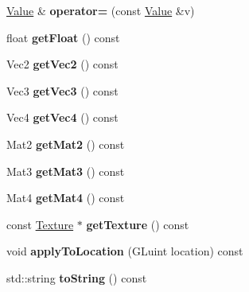 \begin{DoxyCompactItemize}
\item 
\hypertarget{classg2c_1_1_value_affb4cff78b519667994ae075cce2be1e}{
\hyperlink{classg2c_1_1_value}{Value} \& {\bfseries operator=} (const \hyperlink{classg2c_1_1_value}{Value} \&v)}
\label{classg2c_1_1_value_affb4cff78b519667994ae075cce2be1e}

\item 
\hypertarget{classg2c_1_1_value_af8cdb1c197e22bfc84be9525538747e6}{
float {\bfseries getFloat} () const }
\label{classg2c_1_1_value_af8cdb1c197e22bfc84be9525538747e6}

\item 
\hypertarget{classg2c_1_1_value_ac0f42a35725e5831e34440135aa5e806}{
Vec2 {\bfseries getVec2} () const }
\label{classg2c_1_1_value_ac0f42a35725e5831e34440135aa5e806}

\item 
\hypertarget{classg2c_1_1_value_ad184ef70572f68b2594b9925bfbcb56d}{
Vec3 {\bfseries getVec3} () const }
\label{classg2c_1_1_value_ad184ef70572f68b2594b9925bfbcb56d}

\item 
\hypertarget{classg2c_1_1_value_a81fd98e6c48e9c247f694d2549705d14}{
Vec4 {\bfseries getVec4} () const }
\label{classg2c_1_1_value_a81fd98e6c48e9c247f694d2549705d14}

\item 
\hypertarget{classg2c_1_1_value_ad9f2144e1c86c60e88e19001d0e5d556}{
Mat2 {\bfseries getMat2} () const }
\label{classg2c_1_1_value_ad9f2144e1c86c60e88e19001d0e5d556}

\item 
\hypertarget{classg2c_1_1_value_aab3706833fa8337b686e4611ac782ef3}{
Mat3 {\bfseries getMat3} () const }
\label{classg2c_1_1_value_aab3706833fa8337b686e4611ac782ef3}

\item 
\hypertarget{classg2c_1_1_value_a7dd34c269bec21b6e3cae81528e3e275}{
Mat4 {\bfseries getMat4} () const }
\label{classg2c_1_1_value_a7dd34c269bec21b6e3cae81528e3e275}

\item 
\hypertarget{classg2c_1_1_value_a746aef948675640db3046bf7b6223a44}{
const \hyperlink{classg2c_1_1_texture}{Texture} $\ast$ {\bfseries getTexture} () const }
\label{classg2c_1_1_value_a746aef948675640db3046bf7b6223a44}

\item 
\hypertarget{classg2c_1_1_value_a05a75dafa6753fa8de22c0503e84a456}{
void {\bfseries applyToLocation} (GLuint location) const }
\label{classg2c_1_1_value_a05a75dafa6753fa8de22c0503e84a456}

\item 
\hypertarget{classg2c_1_1_value_ab7d2b67ccddb584f27e22d928d809b76}{
std::string {\bfseries toString} () const }
\label{classg2c_1_1_value_ab7d2b67ccddb584f27e22d928d809b76}

\end{DoxyCompactItemize}
